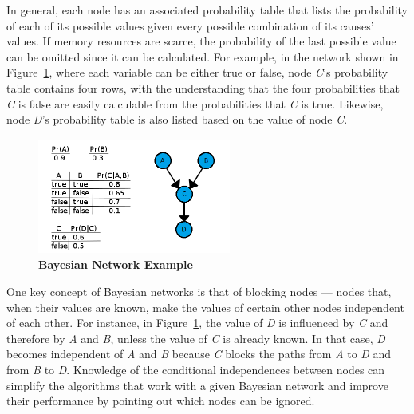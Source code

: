 \documentclass[conference]{IEEEtran}
\begin{document}

In general, each node has an associated probability table that lists the probability of each of its possible values given every possible combination of its causes' values. If memory resources are scarce, the probability of the last possible value  can be omitted since it can be calculated. For example, in the network shown in Figure~\ref{Fig:BayesianNet}, where each variable can be  either true or false, node \emph{C}'s probability table contains four  rows, with the understanding that the four probabilities that \emph{C} is false are easily calculable from the probabilities that \emph{C} is true. Likewise, node \emph{D}'s probability table is also listed based on the value of node \emph{C}.

\begin{figure}[t]
	\centering
	\includegraphics[height=1.5in, width=2.5in]{BayesianNetwork.png}
	\caption{\bf Bayesian Network Example}
	\label{Fig:BayesianNet}
\end{figure}

One key concept of Bayesian networks is that of blocking nodes --- nodes that, when their values are known, make the values of certain other nodes independent of each other. For instance, in Figure~\ref{Fig:BayesianNet}, the value of \emph{D} is influenced by \emph{C} and therefore by \emph{A} and \emph{B}, unless the value of \emph{C} is already known. In that case, \emph{D} becomes independent of \emph{A} and \emph{B} because \emph{C} blocks the paths from \emph{A} to \emph{D} and from \emph{B} to \emph{D}. Knowledge of the conditional independences between nodes can simplify the algorithms that work with a given Bayesian network and improve their performance by pointing out which nodes can be ignored.
\end{document}
